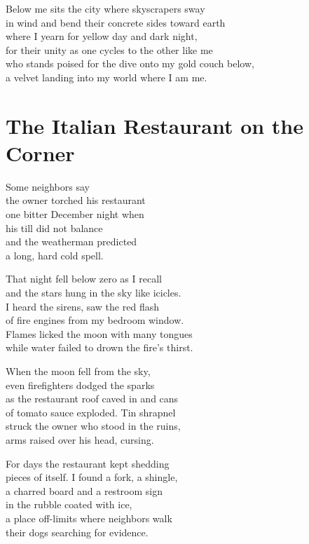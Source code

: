 \documentclass[twoside,10pt]{book}
\begin{document}
Below me sits the city where skyscrapers sway\\
in wind and bend their concrete sides toward earth\\
where I yearn for yellow day and dark night,\\
for their unity as one cycles to the other like me\\
who stands poised for the dive onto my gold couch below,\\
a velvet landing into my world where I am me.


\clearpage
\section{The Italian Restaurant on the Corner}

Some neighbors say\\
the owner torched his restaurant\\
one bitter December night when\\
his till did not balance\\
and the weatherman predicted\\
a long, hard cold spell.

That night fell below zero as I recall\\
and the stars hung in the sky like icicles.\\
I heard the sirens, saw the red flash\\
of fire engines from my bedroom window.\\
Flames licked the moon with many tongues\\
while water failed to drown the fire's thirst.

When the moon fell from the sky,\\
even firefighters dodged the sparks\\
as the restaurant roof caved in and cans\\
of tomato sauce exploded. Tin shrapnel\\
struck the owner who stood in the ruins,\\
arms raised over his head, cursing.

For days the restaurant kept shedding\\
pieces of itself. I found a fork, a shingle,\\
a charred board and a restroom sign\\
in the rubble coated with ice,\\
a place off-limits where neighbors walk\\
their dogs searching for evidence.
\end{document}
